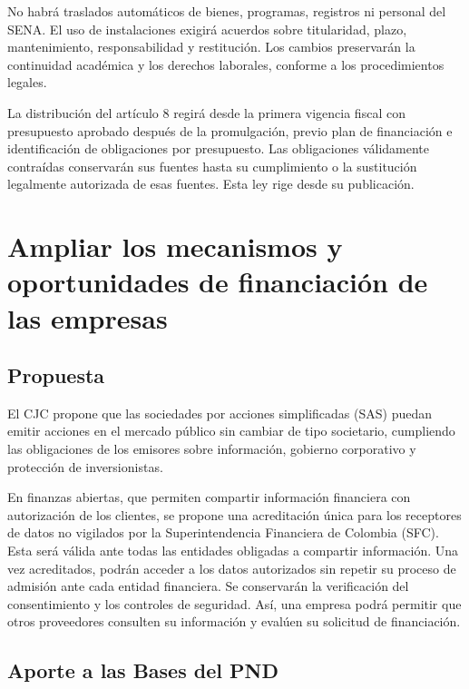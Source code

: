 \begin{mdframed}[linewidth=0.6pt,linecolor=gray!60,backgroundcolor=gray!3,
  innertopmargin=10pt,innerbottommargin=10pt,innerleftmargin=10pt,innerrightmargin=10pt]
No habrá traslados automáticos de bienes, programas, registros ni personal del SENA. El uso de instalaciones exigirá acuerdos sobre titularidad, plazo, mantenimiento, responsabilidad y restitución. Los cambios preservarán la continuidad académica y los derechos laborales, conforme a los procedimientos legales.

La distribución del artículo 8 regirá desde la primera vigencia fiscal con presupuesto aprobado después de la promulgación, previo plan de financiación e identificación de obligaciones por presupuesto. Las obligaciones válidamente contraídas conservarán sus fuentes hasta su cumplimiento o la sustitución legalmente autorizada de esas fuentes. Esta ley rige desde su publicación.
\end{mdframed}
\par\endgroup

\section{Ampliar los mecanismos y oportunidades de financiación de las empresas}
\label{prop:11}

\subsection{Propuesta}

El CJC propone que las sociedades por acciones simplificadas (SAS) puedan emitir acciones en el mercado público sin cambiar de tipo societario, cumpliendo las obligaciones de los emisores sobre información, gobierno corporativo y protección de inversionistas.

En finanzas abiertas, que permiten compartir información financiera con autorización de los clientes, se propone una acreditación única para los receptores de datos no vigilados por la Superintendencia Financiera de Colombia (SFC). Esta será válida ante todas las entidades obligadas a compartir información. Una vez acreditados, podrán acceder a los datos autorizados sin repetir su proceso de admisión ante cada entidad financiera. Se conservarán la verificación del consentimiento y los controles de seguridad. Así, una empresa podrá permitir que otros proveedores consulten su información y evalúen su solicitud de financiación.

\subsection{Aporte a las Bases del PND}

